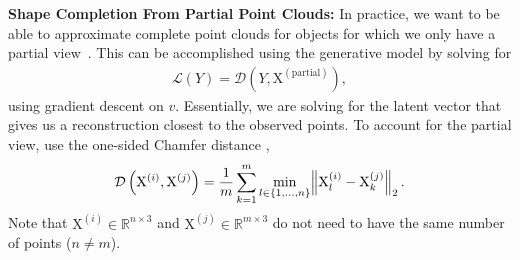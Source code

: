 \documentclass{article}
\newcommand{\pcx}[1]{\mathrm{X}^{(#1)}}
\newcommand{\wxy}[2]{W_{#1 \rightarrow #2}}
\newcommand{\vxy}[2]{V_{#1 \rightarrow #2}}
\newcommand{\pci}{\pcx{i}}
\newcommand{\pcj}{\pcx{j}}
\newcommand{\pcc}{\pcx{C}}
\newcommand{\wij}{\wxy{i}{j}}
\begin{document}

\textbf{Shape Completion From Partial Point Clouds:} In practice, we want to be able to approximate complete point clouds for objects for which we only have a partial view~\cite{thompson21shapebased}. This can be accomplished using the generative model by solving for 
\begin{align}
    \mathcal{L}(Y) = \mathcal{D}(Y, \pcx{\mathrm{partial}}),
    \label{eq:background:loss}
\end{align}
using gradient descent on $v$. Essentially, we are solving for the latent vector that gives us a reconstruction closest to the observed points. To account for the partial view, \citet{thompson21shapebased} use the one-sided Chamfer distance \cite{barrow77parametric},
\begin{align}
    \mathcal{D}\left( \pci, \pcj \right) = \frac{1}{m} \sum_{k=1}^{m} \min_{l \in \{1, ..., n\}} \norm{ \pci_l - \pcj_k }_2.
    \label{eqn:chamfer}
\end{align}
Note that $\pci \in \mathbb{R}^{n \times 3}$ and $\pcj \in \mathbb{R}^{m \times 3}$ do not need to have the same number of points ($n \neq m$).



\end{document}
